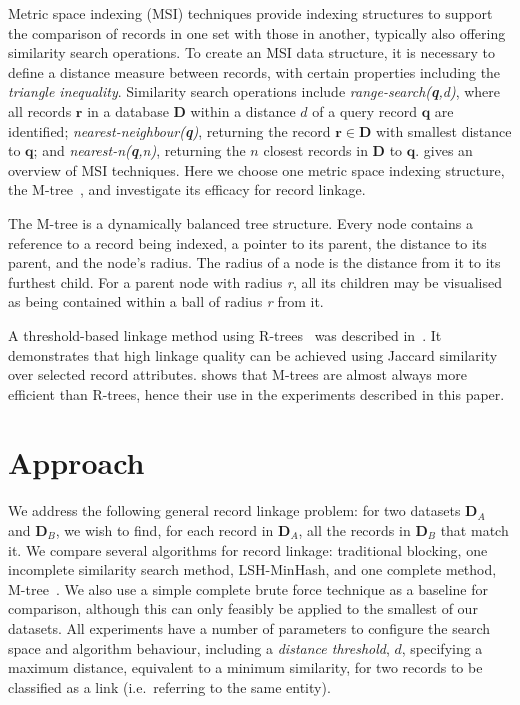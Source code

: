 \documentclass{llncs}
\begin{document}
Metric space indexing (MSI) techniques provide indexing structures to
support the comparison of records in one set with those in another,
typically also offering similarity search operations. To create an MSI
data structure, it is necessary to define a distance measure between
records, with certain properties including the \emph{triangle
inequality}. Similarity search operations include
\emph{range-search(\textbf{q},d)}, where all records $\mathbf{r}$
in a database $\mathbf{D}$ within a distance $d$ of a query record
$\mathbf{q}$ are identified; \emph{nearest-neighbour(\textbf{q})},
returning the record $\mathbf{r} \in \mathbf{D}$ with smallest
distance to $\mathbf{q}$; and \emph{nearest-n(\textbf{q},n)}, returning
the $n$ closest records in $\mathbf{D}$ to $\mathbf{q}$.
\cite{Zezula2010} gives an overview of MSI techniques. Here we choose
one metric space indexing structure, the M-tree~\cite{paolociaccia2m},
and investigate its efficacy for record linkage.

The M-tree is a dynamically balanced tree structure. Every node contains
a reference to a record being indexed, a pointer to its parent, the
distance to its parent, and the node's radius. The radius of a node is
the distance from it to its furthest child. For a parent node with
radius \textit{r}, all its children may be visualised as being contained
within a ball of radius \textit{r} from it.

A threshold-based linkage method using R-trees~\cite{Hjaltason1998}
was described in~\cite{Li2006}. It demonstrates that high linkage
quality can be achieved using Jaccard similarity over selected record
attributes. \cite{Ciaccia97indexingmetric} shows that M-trees are
almost always more efficient than R-trees, hence their use in the
experiments described in this paper.


\section{Approach}
\label{sec-approach}

We address the following general record linkage problem: for two
datasets $\mathbf{D}_A$ and $\mathbf{D}_B$, we wish to find, for each
record in $\mathbf{D}_A$, all the records in $\mathbf{D}_B$ that match
it. We compare several algorithms for record linkage: traditional
blocking, one incomplete similarity search method, LSH-MinHash, and
one complete method, M-tree~\cite{paolociaccia2m}. We also use a
simple complete brute force technique as a baseline for comparison,
although this can only feasibly be applied to the smallest of our
datasets. All experiments have a number of parameters to configure
the search space and algorithm behaviour, including a
\emph{distance threshold}, $d$, specifying a maximum distance,
equivalent to a minimum similarity, for two records to be classified
as a link (i.e.\ referring to the same entity).
\end{document}
